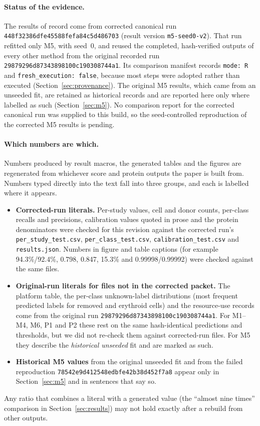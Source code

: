 \documentclass[11pt]{article}
\newcommand{\runid}{\nolinkurl{448f32386dfe45588fefa84c5d486703}}
\newcommand{\origrunid}{\nolinkurl{29879296d87343898100c190308744a1}}
\newcommand{\failrunid}{\nolinkurl{78542e9d412548edbfe42b38d452f7a8}}
\newcommand{\code}[1]{\texttt{#1}}
\newif\ifctreport
\newcommand{\Reprostatus}{\ifctreport A seed-controlled reproduction of the corrected M5 results was run and compared with the corrected canonical run by the repository's tiered comparison; that internal comparison reports overall status ``\ctres{comparison}{report}{overall}''. This is an internal tolerance comparison by the same pipeline, not independent verification\else No comparison report for the corrected canonical run was supplied to this build, so the seed-controlled reproduction of the corrected M5 results is pending\fi}
\begin{document}
\paragraph{Status of the evidence.} The results of record come from corrected canonical run \runid{} (result version \code{m5-seed0-v2}). That run refitted only M5, with seed~0, and reused the completed, hash-verified outputs of every other method from the original recorded run \origrunid. Its comparison manifest records \verb|mode: R| and \verb|fresh_execution: false|, because most steps were adopted rather than executed (Section~\ref{sec:provenance}). The original M5 results, which came from an unseeded fit, are retained as historical records and are reported here only where labelled as such (Section~\ref{sec:m5}). \Reprostatus.

\paragraph{Which numbers are which.} Numbers produced by result macros, the generated tables and the figures are regenerated from whichever score and protein outputs the paper is built from. Numbers typed directly into the text fall into three groups, and each is labelled where it appears.
\begin{itemize}
\item \textbf{Corrected-run literals.} Per-study values, cell and donor counts, per-class recalls and precisions, calibration values quoted in prose and the protein denominators were checked for this revision against the corrected run's \nolinkurl{per_study_test.csv}, \nolinkurl{per_class_test.csv}, \nolinkurl{calibration_test.csv} and \nolinkurl{results.json}. Numbers in figure and table captions (for example 94.3\%/92.4\%, 0.798, 0.847, 15.3\% and 0.99998/0.99992) were checked against the same files.
\item \textbf{Original-run literals for files not in the corrected packet.} The platform table, the per-class unknown-label distributions (most frequent predicted labels for removed and erythroid cells) and the resource-use records come from the original run \origrunid. For M1--M4, M6, P1 and P2 these rest on the same hash-identical predictions and thresholds, but we did not re-check them against corrected-run files. For M5 they describe the \emph{historical unseeded} fit and are marked as such.
\item \textbf{Historical M5 values} from the original unseeded fit and from the failed reproduction \failrunid{} appear only in Section~\ref{sec:m5} and in sentences that say so.
\end{itemize}
Any ratio that combines a literal with a generated value (the ``almost nine times'' comparison in Section~\ref{sec:results}) may not hold exactly after a rebuild from other outputs.
\end{document}
